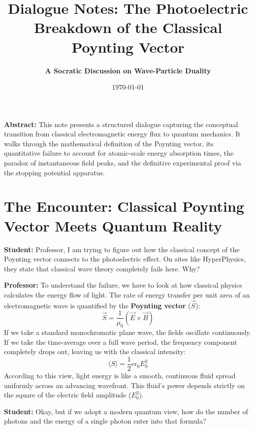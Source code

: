 \documentclass[11pt,a4paper]{article}
\title{\textbf{Dialogue Notes: The Photoelectric Breakdown of the Classical Poynting Vector}}
\author{\textbf{A Socratic Discussion on Wave-Particle Duality}}
\date{\today}
\newcommand{\Professor}{\noindent\textbf{\textcolor{profcolor}{Professor:}} }
\newcommand{\Student}{\noindent\textbf{\textcolor{studcolor}{Student:}} }
\begin{document}
	
	\maketitle
	
	\begin{mdframed}[backgroundcolor=gray!5, linecolor=gray!40, roundcorner=5pt]
		\textbf{Abstract:} This note presents a structured dialogue capturing the conceptual transition from classical electromagnetic energy flux to quantum mechanics. It walks through the mathematical definition of the Poynting vector, its quantitative failure to account for atomic-scale energy absorption times, the paradox of instantaneous field peaks, and the definitive experimental proof via the stopping potential apparatus.
	\end{mdframed}
	
	\section{The Encounter: Classical Poynting Vector Meets Quantum Reality}
	
	\Student Professor, I am trying to figure out how the classical concept of the Poynting vector connects to the photoelectric effect. On sites like HyperPhysics, they state that classical wave theory completely fails here. Why?
	
	\Professor To understand the failure, we have to look at how classical physics calculates the energy flow of light. The rate of energy transfer per unit area of an electromagnetic wave is quantified by the \textbf{Poynting vector} ($\vec{S}$):
	\begin{equation}
		\vec{S} = \frac{1}{\mu_0} (\vec{E} \times \vec{B})
	\end{equation}
	If we take a standard monochromatic plane wave, the fields oscillate continuously. If we take the time-average over a full wave period, the frequency component completely drops out, leaving us with the classical intensity:
	\begin{equation}
		\langle S \rangle = \frac{1}{2} c \epsilon_0 E_0^2
	\end{equation}
	According to this view, light energy is like a smooth, continuous fluid spread uniformly across an advancing wavefront. This fluid's power depends strictly on the square of the electric field amplitude ($E_0^2$).
	
	\Student Okay, but if we adopt a modern quantum view, how do the number of photons and the energy of a single photon enter into that formula?
	
\end{document}
